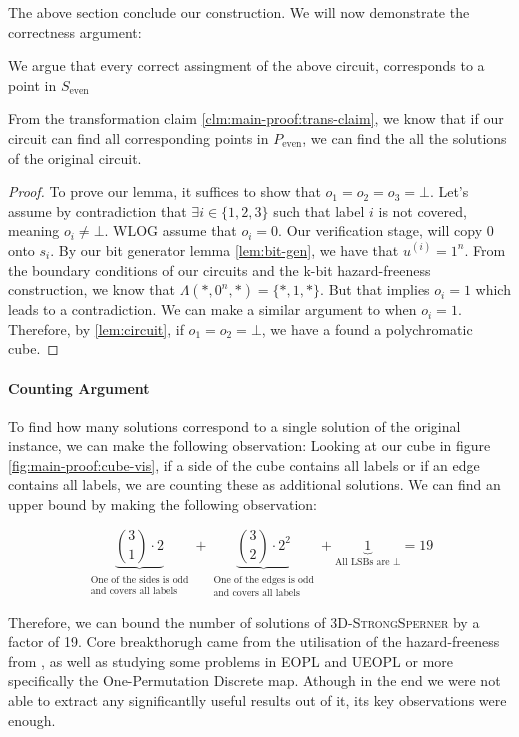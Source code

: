 The above section conclude our construction. We will now demonstrate the correctness argument:

\begin{lemma}
    We argue that every correct assingment of the above circuit, corresponds to a point in $S_{\text{even}}$
\end{lemma}
From the transformation claim \ref{clm:main-proof:trans-claim}, we know that if our circuit
can find all corresponding points in $P_{\text{even}}$, we can find the all the solutions of the original circuit.

\begin{proof}
    To prove our lemma, it suffices to show that $o_1 = o_2 = o_3 = \bot$. Let's assume by contradiction that
    $\exists i \in \{1,2,3\}$ such that label $i$ is not covered, meaning $o_i \neq \bot$.
    WLOG assume that $o_i = 0$. Our verification stage, will copy $0$ onto $s_i$. By our
    bit generator lemma \ref{lem:bit-gen}, we have that $u^{(i)} = 1^n$. From the boundary
    conditions of our circuits and the k-bit hazard-freeness construction,
    we know that $\Lambda(*, 0^n, *) = \{*, 1,  *\}$. But that implies
    $o_i = 1$ which leads to a contradiction. We can make a similar argument to when $o_i = 1$.
    Therefore, by \ref{lem:circuit}, if $o_1 = o_2 = \bot$, we have a found a polychromatic
    cube.
\end{proof}

\paragraph*{Counting Argument}

To find how many solutions correspond to a single solution of the original instance,
we can make the following observation: Looking at our cube in figure \ref{fig:main-proof:cube-vis},
if a side of the cube contains all labels or if an edge contains all labels, we are counting
these as additional solutions. We can find an upper bound by making the following observation:

$$
\underbrace{\binom{3}{1} \cdot 2}_{\substack{\text{One of the sides is odd} \\ \text{and covers all labels}}}
+ \underbrace{\binom{3}{2} \cdot 2^2}_{\substack{\text{One of the edges is odd} \\ \text{and covers all labels}}}
+ \underbrace{1}_{\text{All LSBs are } \bot} = 19
$$

Therefore, we can bound the number of solutions of \textsc{3D-StrongSperner} by a factor of 19.
Core breakthorugh came from the utilisation of the hazard-freeness from \cite{ikenmeyer_ComplexityHazardfreeCircuits_2019},
as well as studying some problems in EOPL and UEOPL or more specifically the
One-Permutation Discrete map. Athough in the end we were not able to extract any significantlly
useful results out of it, its key observations were enough.


